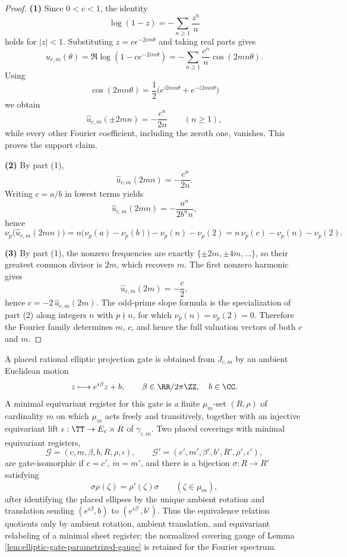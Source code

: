 \begin{proof}
\textbf{(1)} Since \(0<c<1\), the identity
\[
\log(1-z)=-\sum_{n\ge 1}\frac{z^n}{n}
\]
holds for \(|z|<1\). Substituting \(z=c e^{-2im\theta}\) and taking real parts gives
\[
u_{c,m}(\theta)=\Re\log(1-c e^{-2im\theta})
=-\sum_{n\ge 1}\frac{c^n}{n}\cos(2mn\theta).
\]
Using
\[
\cos(2mn\theta)=\frac12\bigl(e^{i2mn\theta}+e^{-i2mn\theta}\bigr)
\]
we obtain
\[
\widehat u_{c,m}(\pm 2mn)=-\frac{c^n}{2n}
\qquad (n\ge 1),
\]
while every other Fourier coefficient, including the zeroth one, vanishes. This proves the support claim.

\textbf{(2)} By part (1),
\[
\widehat u_{c,m}(2mn)=-\frac{c^n}{2n}.
\]
Writing \(c=a/b\) in lowest terms yields
\[
\widehat u_{c,m}(2mn)=-\frac{a^n}{2b^n n},
\]
hence
\[
\nu_p\!\bigl(\widehat u_{c,m}(2mn)\bigr)
=n\bigl(\nu_p(a)-\nu_p(b)\bigr)-\nu_p(n)-\nu_p(2)
=n\,\nu_p(c)-\nu_p(n)-\nu_p(2).
\]

\textbf{(3)} By part (1), the nonzero frequencies are exactly \(\{\pm 2m,\pm 4m,\ldots\}\), so their greatest common divisor is \(2m\), which recovers \(m\). The first nonzero harmonic gives
\[
\widehat u_{c,m}(2m)=-\frac{c}{2},
\]
hence \(c=-2\,\widehat u_{c,m}(2m)\). The odd-prime slope formula is the specialization of part (2) along integers \(n\) with \(p\nmid n\), for which \(\nu_p(n)=\nu_p(2)=0\). Therefore the Fourier family determines \(m\), \(c\), and hence the full valuation vectors of both \(c\) and \(m\).
\end{proof}

\begin{definition}\label{def:equivariant-elliptic-gate-isomorphism}
A placed rational elliptic projection gate is obtained from \(J_{c,m}\) by an ambient Euclidean motion
\[
z\longmapsto e^{i\beta}z+b,
\qquad \beta\in\RR/2\pi\ZZ,
\quad b\in\CC.
\]
A minimal equivariant register for this gate is a finite \(\mu_m\)-set \((R,\rho)\) of cardinality \(m\) on which \(\mu_m\) acts freely and transitively, together with an injective equivariant lift \(\iota:\TT\to E_c\times R\) of \(\gamma_{c,m}\).  Two placed coverings with minimal equivariant registers,
\[
\mathcal G=(c,m,\beta,b,R,\rho,\iota),
\qquad
\mathcal G'=(c',m',\beta',b',R',\rho',\iota'),
\]
are gate-isomorphic if \(c=c'\), \(m=m'\), and there is a bijection \(\sigma:R\to R'\) satisfying
\[
\sigma\rho(\zeta)=\rho'(\zeta)\sigma
\qquad(\zeta\in\mu_m),
\]
after identifying the placed ellipses by the unique ambient rotation and translation sending \((e^{i\beta},b)\) to \((e^{i\beta'},b')\).  Thus the equivalence relation quotients only by ambient rotation, ambient translation, and equivariant relabeling of a minimal sheet register; the normalized covering gauge of Lemma \ref{lem:elliptic-gate-parametrized-gauge} is retained for the Fourier spectrum.
\end{definition}

